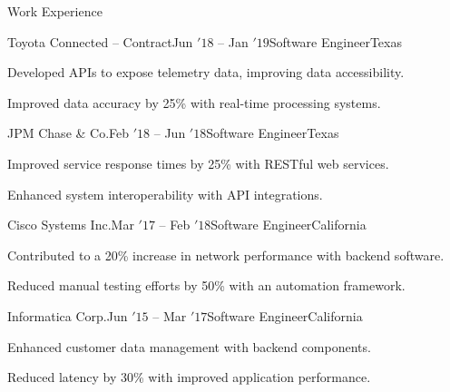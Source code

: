 \documentclass{resume} %
\begin{document}
\begin{rSection}{Work Experience}
\begin{rSubsection}{Toyota Connected -- Contract}{Jun \('18\) -- Jan \('19\)}{Software Engineer}{Texas}
\item Developed APIs to expose telemetry data, improving data accessibility.
\item Improved data accuracy by 25\% with real-time processing systems.
\end{rSubsection}

\begin{rSubsection}{JPM Chase \& Co.}{Feb \('18\) -- Jun \('18\)}{Software Engineer}{Texas}
\item Improved service response times by 25\% with RESTful web services.
\item Enhanced system interoperability with API integrations.
\end{rSubsection}
\begin{rSubsection}{Cisco Systems Inc.}{Mar \('17\) -- Feb \('18\)}{Software Engineer}{California}
\item Contributed to a 20\% increase in network performance with backend software.
\item Reduced manual testing efforts by 50\% with an automation framework.

\end{rSubsection}

\begin{rSubsection}{Informatica Corp.}{Jun \('15\) -- Mar \('17\)}{Software Engineer}{California}
\item Enhanced customer data management with backend components.
\item Reduced latency by 30\% with improved application performance.
\end{rSubsection}


\end{rSection}
\newpage
\end{document}
